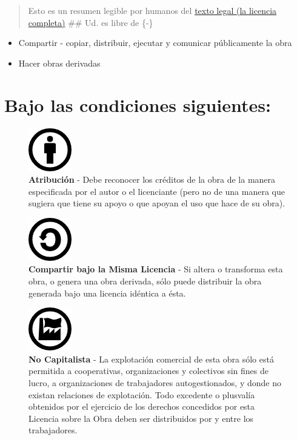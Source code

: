 \documentclass[
]{book}
\providecommand{\tightlist}{%
  \setlength{\itemsep}{0pt}\setlength{\parskip}{0pt}}
\begin{document}
\begin{quote}
Esto es un resumen legible por humanos del \href{http://endefensadelsl.org/ppl_es.html}{texto legal (la licencia
completa)}
\#\# Ud. es libre de \{-\}
\end{quote}

\begin{itemize}
\tightlist
\item
  Compartir - copiar, distribuir, ejecutar y comunicar públicamente la obra
\item
  Hacer obras derivadas
\end{itemize}

\hypertarget{bajo-las-condiciones-siguientes}{%
\section*{Bajo las condiciones siguientes:}\label{bajo-las-condiciones-siguientes}}

\begin{figure}
\centering
\includegraphics{images/by.png}
\caption{\textbf{Atribución} - Debe reconocer los créditos de la obra de la manera
especificada por el autor o el licenciante (pero no de una manera que sugiera
que tiene su apoyo o que apoyan el uso que hace de su obra).}
\end{figure}

\begin{figure}
\centering
\includegraphics{images/sa.png}
\caption{\textbf{Compartir bajo la Misma Licencia} - Si altera o transforma esta obra, o
genera una obra derivada, sólo puede distribuir la obra generada bajo una
licencia idéntica a ésta.}
\end{figure}

\begin{figure}
\centering
\includegraphics{images/nc.png}
\caption{\textbf{No Capitalista} - La explotación comercial de esta obra sólo está permitida
a cooperativas, organizaciones y colectivos sin fines de lucro, a
organizaciones de trabajadores autogestionados, y donde no existan relaciones
de explotación. Todo excedente o plusvalía obtenidos por el ejercicio de los
derechos concedidos por esta Licencia sobre la Obra deben ser distribuidos por y
entre los trabajadores.}
\end{figure}
\end{document}
